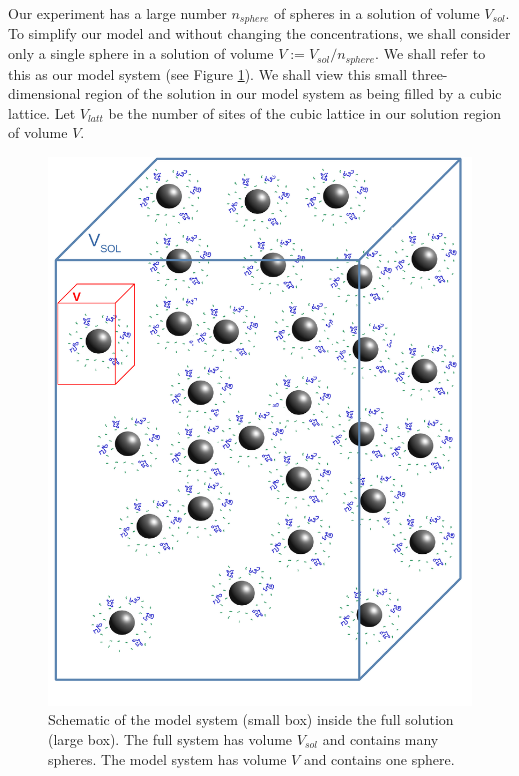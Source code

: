 \documentclass[journal=mamobx,manuscript=article]{achemso}
\begin{document}
Our experiment has a large number $n_{sphere}$ of spheres in a solution of volume $V_{sol}$.  
To simplify 
our model and without changing the concentrations, we shall consider only a single sphere in a solution
of volume $V:=V_{sol}/n_{sphere}$.  We shall refer to this as our model system (see Figure \ref{figure1volume}).
We shall view this small three-dimensional region of the solution in our model system as being filled by a 
cubic lattice.
Let $V_{latt}$ be the number of sites of the cubic 
lattice in our solution region of volume $V$.




 \begin{figure}[H] 
  \includegraphics[scale=0.5]{fig7a_apr20_2020.pdf}
\caption{Schematic of the model system (small box)
inside the full solution (large box). The full system
has volume $V_{sol}$ and contains many spheres.  The model
system has volume $V$ and contains one sphere.}
\label{figure1volume}
\end{figure}
\end{document}
